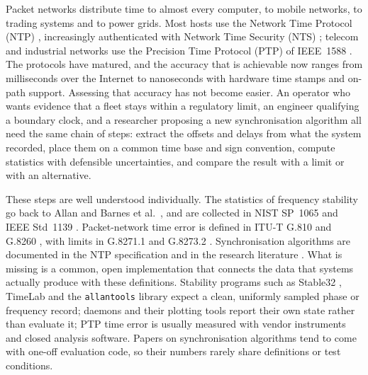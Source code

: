 \documentclass[11pt,a4paper]{article}
\begin{document}
Packet networks distribute time to almost every computer, to mobile networks, to trading systems
and to power grids. Most hosts use the Network Time Protocol (NTP) \citep{mills1991,rfc5905}, increasingly
authenticated with Network Time Security (NTS) \citep{rfc8915}; telecom and industrial networks use the
Precision Time Protocol (PTP) of IEEE~1588 \citep{ieee1588}. The protocols have matured, and the
accuracy that is achievable now ranges from milliseconds over the Internet to nanoseconds with hardware
time stamps and on-path support. Assessing that accuracy has not become easier. An operator who wants
evidence that a fleet stays within a regulatory limit, an engineer qualifying a boundary clock, and a
researcher proposing a new synchronisation algorithm all need the same chain of steps: extract the
offsets and delays from what the system recorded, place them on a common time base and sign
convention, compute statistics with defensible uncertainties, and compare the result with a limit or
with an alternative.

These steps are well understood individually. The statistics of frequency stability go back to Allan
\citep{allan1966} and Barnes et al.\ \citep{barnes1971}, and are collected in NIST SP~1065 \citep{riley2008}
and IEEE Std~1139 \citep{ieee1139}. Packet-network time error is defined in ITU-T G.810 and G.8260
\citep{g810,g8260}, with limits in G.8271.1 and G.8273.2 \citep{g8271_1,g8273_2}. Synchronisation
algorithms are documented in the NTP specification \citep{rfc5905} and in the research literature
\citep{veitch2009,geng2018,li2020sundial}. What is missing is a common, open implementation that
connects the data that systems actually produce with these definitions. Stability programs such as
Stable32 \citep{stable32}, TimeLab \citep{timelab} and the \texttt{allantools} library \citep{allantools}
expect a clean, uniformly sampled phase or frequency record; daemons and their plotting tools
\citep{ntpviz} report their own state rather than evaluate it; PTP time error is usually measured with
vendor instruments and closed analysis software. Papers on synchronisation algorithms tend to come with
one-off evaluation code, so their numbers rarely share definitions or test conditions.
\end{document}
